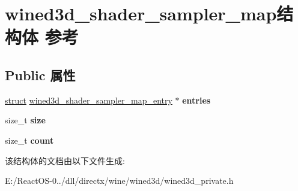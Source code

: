 \hypertarget{structwined3d__shader__sampler__map}{}\section{wined3d\+\_\+shader\+\_\+sampler\+\_\+map结构体 参考}
\label{structwined3d__shader__sampler__map}
\subsection*{Public 属性}
\begin{DoxyCompactItemize}
\item 
\mbox{\label{structwined3d__shader__sampler__map_ac60b8082af89e835d68129e7358b80cd}} 
\hyperlink{interfacestruct}{struct} \hyperlink{structwined3d__shader__sampler__map__entry}{wined3d\+\_\+shader\+\_\+sampler\+\_\+map\+\_\+entry} $\ast$ {\bfseries entries}
\item 
\mbox{\label{structwined3d__shader__sampler__map_a04c835ad6ebad6c4b4d9e13b8dd1967b}} 
size\+\_\+t {\bfseries size}
\item 
\mbox{\label{structwined3d__shader__sampler__map_adfbfa9a0b88915ce59de2fade0a91629}} 
size\+\_\+t {\bfseries count}
\end{DoxyCompactItemize}


该结构体的文档由以下文件生成\+:\begin{DoxyCompactItemize}
\item 
E\+:/\+React\+O\+S-\/0../dll/directx/wine/wined3d/wined3d\+\_\+private.\+h\end{DoxyCompactItemize}
